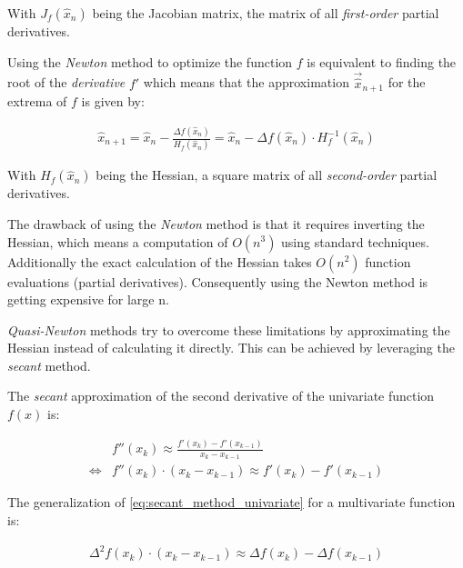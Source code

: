 With $J_f(\hat{x}_{n})$ being the Jacobian matrix, the matrix of all \textit{first-order} partial derivatives.


Using the \textit{Newton} method to optimize the function $f$ is equivalent to finding the root of the \textit{derivative}  $f'$ which means that the approximation $\vec{\hat{x}}_{n+1}$ for the extrema of $f$ is given by:

\begin{equation}\label{eq:newtons_method_multivariate_extrema}
	\begin{array}{c}
		\hat{x}_{n+1} =\hat{x}_{n} - \frac{\Delta f(\hat{x}_{n})}{H_f(\hat{x}_{n})} = \hat{x}_{n} - \Delta f(\hat{x}_{n}) \cdot H_f^{-1}(\hat{x}_{n}) 
	\end{array}
\end{equation}

With $H_f(\hat{x}_{n})$ being the Hessian, a square matrix of all \textit{second-order} partial derivatives.

The drawback of using the \textit{Newton} method is that it requires inverting the Hessian, which means a computation of $O(n^3)$ using standard techniques. Additionally the exact calculation of the Hessian takes $O(n^2)$ function evaluations (partial derivatives). Consequently using the Newton method is getting expensive for large n. 

\textit{Quasi-Newton} methods try to overcome these limitations by approximating the Hessian instead of calculating it directly. This can be achieved by leveraging the \textit{secant} method.

The \textit{secant} approximation of the second derivative of the univariate function $f(x)$ is:

\begin{equation}\label{eq:secant_method_univariate}
	\begin{array}{lc}
		&f''(x_k) \approx \frac{f'(x_k) - f'(x_{k-1})}{x_k - x_{k-1}}\\
        \Leftrightarrow &f''(x_k) \cdot (x_k - x_{k-1})\approx f'(x_k) - f'(x_{k-1})
	\end{array}
\end{equation}

The generalization of \eqref{eq:secant_method_univariate} for a multivariate function is:

\begin{equation}\label{eq:secant_method_multivariate}
	\begin{array}{lc}
		\Delta^2 f(x_k) \cdot (x_k - x_{k-1})\approx \Delta f(x_k) - \Delta f(x_{k-1})
	\end{array}
\end{equation}

